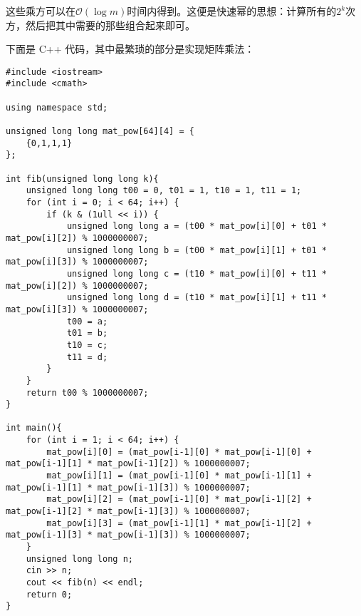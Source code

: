 \documentclass[UTF8,12pt]{ctexart}
\begin{document}
这些乘方可以在$\mathcal{O}(\log m)$时间内得到。这便是快速幂的思想：计算所有的$2^k$次方，然后把其中需要的那些组合起来即可。

下面是 C++ 代码，其中最繁琐的部分是实现矩阵乘法：

\begin{lstlisting}
#include <iostream>
#include <cmath>

using namespace std;

unsigned long long mat_pow[64][4] = {
    {0,1,1,1}
};

int fib(unsigned long long k){
    unsigned long long t00 = 0, t01 = 1, t10 = 1, t11 = 1;
    for (int i = 0; i < 64; i++) {
        if (k & (1ull << i)) {
            unsigned long long a = (t00 * mat_pow[i][0] + t01 * mat_pow[i][2]) % 1000000007;
            unsigned long long b = (t00 * mat_pow[i][1] + t01 * mat_pow[i][3]) % 1000000007;
            unsigned long long c = (t10 * mat_pow[i][0] + t11 * mat_pow[i][2]) % 1000000007;
            unsigned long long d = (t10 * mat_pow[i][1] + t11 * mat_pow[i][3]) % 1000000007;
            t00 = a;
            t01 = b;
            t10 = c;
            t11 = d;
        }
    }
    return t00 % 1000000007;
}

int main(){
    for (int i = 1; i < 64; i++) {
        mat_pow[i][0] = (mat_pow[i-1][0] * mat_pow[i-1][0] + mat_pow[i-1][1] * mat_pow[i-1][2]) % 1000000007;
        mat_pow[i][1] = (mat_pow[i-1][0] * mat_pow[i-1][1] + mat_pow[i-1][1] * mat_pow[i-1][3]) % 1000000007;
        mat_pow[i][2] = (mat_pow[i-1][0] * mat_pow[i-1][2] + mat_pow[i-1][2] * mat_pow[i-1][3]) % 1000000007;
        mat_pow[i][3] = (mat_pow[i-1][1] * mat_pow[i-1][2] + mat_pow[i-1][3] * mat_pow[i-1][3]) % 1000000007;
    }
    unsigned long long n;
    cin >> n;
    cout << fib(n) << endl;
    return 0;
}    
\end{lstlisting}
\end{document}
